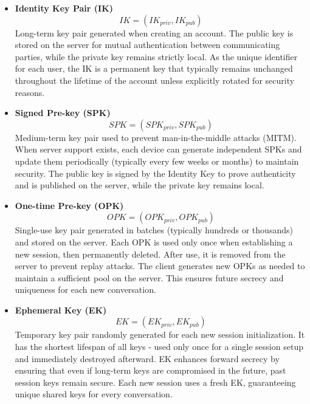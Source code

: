 \documentclass[9pt,a4paper,twoside]{rho-class/rho}
\begin{document}
\begin{itemize}
    \item \textbf{Identity Key Pair (IK)}
$$IK = (IK_{priv}, IK_{pub})$$
Long-term key pair generated when creating an account. The public key is stored on the server for mutual authentication between communicating parties, while the private key remains strictly local. As the unique identifier for each user, the IK is a permanent key that typically remains unchanged throughout the lifetime of the account unless explicitly rotated for security reasons.

\item \textbf{Signed Pre-key (SPK)}
$$SPK = (SPK_{priv}, SPK_{pub})$$
Medium-term key pair used to prevent man-in-the-middle attacks (MITM). When server support exists, each device can generate independent SPKs and update them periodically (typically every few weeks or months) to maintain security. The public key is signed by the Identity Key to prove authenticity and is published on the server, while the private key remains local.

\item \textbf{One-time Pre-key (OPK)}
$$OPK = (OPK_{priv}, OPK_{pub})$$
Single-use key pair generated in batches (typically hundreds or thousands) and stored on the server. Each OPK is used only once when establishing a new session, then permanently deleted. After use, it is removed from the server to prevent replay attacks. The client generates new OPKs as needed to maintain a sufficient pool on the server. This ensures future secrecy and uniqueness for each new conversation.

\item \textbf{Ephemeral Key (EK)}
$$EK = (EK_{priv}, EK_{pub})$$
Temporary key pair randomly generated for each new session initialization. It has the shortest lifespan of all keys - used only once for a single session setup and immediately destroyed afterward. EK enhances forward secrecy by ensuring that even if long-term keys are compromised in the future, past session keys remain secure. Each new session uses a fresh EK, guaranteeing unique shared keys for every conversation.
\end{itemize}
\end{document}
